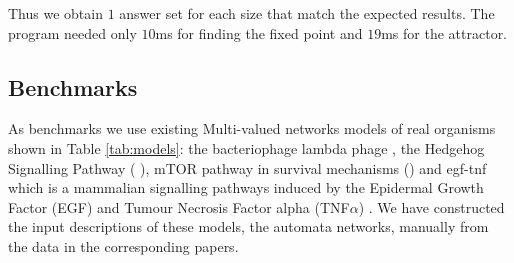 Thus we obtain $1$ answer set for each size that match the expected results. The program needed only $10$ms for finding the fixed point and $19$ms for the attractor.

\subsection{Benchmarks}
As benchmarks we use existing Multi-valued networks models of real organisms shown in Table \ref{tab:models}\benchmarksfootnote: the bacteriophage lambda phage \cite{thieffry1995dynamical}, the Hedgehog Signalling Pathway ( \cite{stecca2010context}), mTOR pathway in survival mechanisms \cite{javle2010inhibition} () and egf-tnf which is a mammalian signalling pathways induced by the Epidermal Growth Factor (EGF) and Tumour Necrosis Factor alpha (TNF$\alpha$) \cite{chaouiya2013sbml}.
We have constructed the input descriptions of these models, the automata networks, manually from the data in the corresponding papers.

